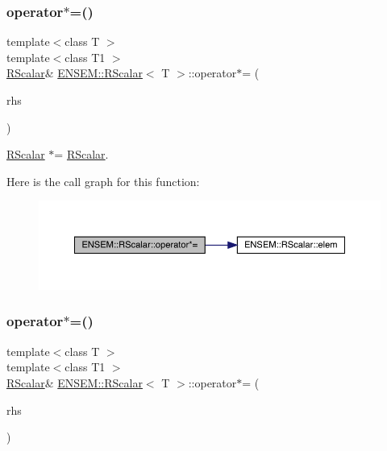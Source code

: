 \subsubsection{\texorpdfstring{operator$\ast$=()}{operator*=()}\hspace{0.1cm}{\footnotesize\ttfamily [2/3]}}
{\footnotesize\ttfamily template$<$class T $>$ \\
template$<$class T1 $>$ \\
\mbox{\hyperlink{classENSEM_1_1RScalar}{R\+Scalar}}\& \mbox{\hyperlink{classENSEM_1_1RScalar}{E\+N\+S\+E\+M\+::\+R\+Scalar}}$<$ T $>$\+::operator$\ast$= (\begin{DoxyParamCaption}\item[{const \mbox{\hyperlink{classENSEM_1_1RScalar}{R\+Scalar}}$<$ T1 $>$ \&}]{rhs }\end{DoxyParamCaption})\hspace{0.3cm}{\ttfamily [inline]}}



\mbox{\hyperlink{classENSEM_1_1RScalar}{R\+Scalar}} $\ast$= \mbox{\hyperlink{classENSEM_1_1RScalar}{R\+Scalar}}. 

Here is the call graph for this function\+:
\nopagebreak
\begin{figure}[H]
\begin{center}
\leavevmode
\includegraphics[width=350pt]{d0/d8c/classENSEM_1_1RScalar_a4e8f4b8988a47a5e5eef56424d0e23d9_cgraph}
\end{center}
\end{figure}
\mbox{\label{classENSEM_1_1RScalar_a4e8f4b8988a47a5e5eef56424d0e23d9}} 
\subsubsection{\texorpdfstring{operator$\ast$=()}{operator*=()}\hspace{0.1cm}{\footnotesize\ttfamily [3/3]}}
{\footnotesize\ttfamily template$<$class T $>$ \\
template$<$class T1 $>$ \\
\mbox{\hyperlink{classENSEM_1_1RScalar}{R\+Scalar}}\& \mbox{\hyperlink{classENSEM_1_1RScalar}{E\+N\+S\+E\+M\+::\+R\+Scalar}}$<$ T $>$\+::operator$\ast$= (\begin{DoxyParamCaption}\item[{const \mbox{\hyperlink{classENSEM_1_1RScalar}{R\+Scalar}}$<$ T1 $>$ \&}]{rhs }\end{DoxyParamCaption})\hspace{0.3cm}{\ttfamily [inline]}}



